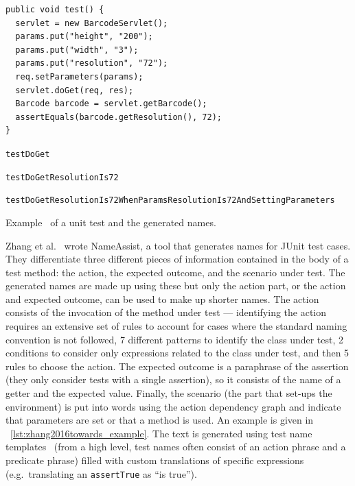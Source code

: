 \documentclass[a4paper,11pt]{sdm_internship}
\theoremstyle{definition}
\begin{document}
\begin{listing}
  \centering
  \begin{verbatim}
public void test() {
  servlet = new BarcodeServlet();
  params.put("height", "200");
  params.put("width", "3");
  params.put("resolution", "72");
  req.setParameters(params);
  servlet.doGet(req, res);
  Barcode barcode = servlet.getBarcode();
  assertEquals(barcode.getResolution(), 72);
}
  \end{verbatim}
  \begin{description}[align=right,labelwidth=2.1cm]
    \item[small] \texttt{testDoGet}
    \item[medium] \texttt{testDoGetResolutionIs72}
    \item[full] \texttt{testDoGetResolutionIs72WhenParamsResolutionIs72AndSettingParameters}
  \end{description}
  \caption{Example~\cite{zhang2016towards} of a unit test and the generated names.}%
\label{lst:zhang2016towards_example}
\end{listing}
Zhang et al.~\cite{zhang2016towards} wrote NameAssist, a tool that generates names for JUnit test cases.
They differentiate three different pieces of information contained in the body of a test method: the action, the expected outcome, and the scenario under test.
The generated names are made up using these but only the action part, or the action and expected outcome, can be used to make up shorter names.
The action consists of the invocation of the method under test --- identifying the action requires an extensive set of rules to account for cases where the standard naming convention is not followed, 7 different patterns to identify the class under test, 2 conditions to consider only expressions related to the class under test, and then 5 rules to choose the action.
The expected outcome is a paraphrase of the assertion (they only consider tests with a single assertion), so it consists of the name of a getter and the expected value.
Finally, the scenario (the part that set-ups the environment) is put into words using the action dependency graph and indicate that parameters are set or that a method is used.
An example is given in \listingname~\ref{lst:zhang2016towards_example}.
The text is generated using test name templates~\cite{zhang2015automatically} (from a high level, test names often consist of an action phrase and a predicate phrase) filled with custom translations of specific expressions (e.g.\ translating an \texttt{assertTrue} as ``is true'').
\end{document}
